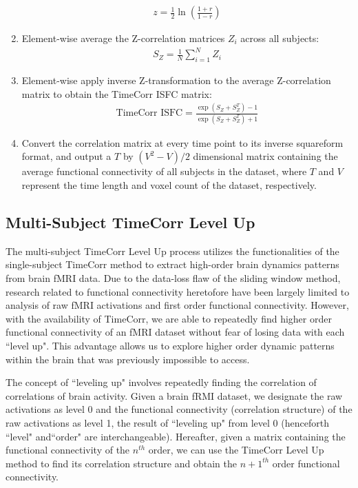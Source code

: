\documentclass[11pt]{article}
\begin{document}
\begin{enumerate}
\begin{align*}
z = \frac{1}{2}\ln(\frac{1+r}{1-r})
\end{align*}
\item Element-wise average the Z-correlation matrices $Z_i$ across all subjects:
\begin{align*}
S_Z = \frac{1}{N}\sum^N_{i=1}Z_i
\end{align*}
\item Element-wise apply inverse Z-transformation to the average Z-correlation matrix to obtain the TimeCorr ISFC matrix:
\begin{align*}
\text{TimeCorr ISFC} = \frac{\exp(S_Z+S_Z^T)-1}{\exp(S_Z+S_Z^T)+1}
\end{align*}
\item Convert the correlation matrix at every time point to its inverse squareform format, and output a $T$ by $(V^2-V)/2$ dimensional matrix containing the average functional connectivity of all subjects in the dataset, where $T$ and $V$ represent the time length and voxel count of the dataset, respectively.
\end{enumerate}

\subsection{Multi-Subject TimeCorr Level Up}
The multi-subject TimeCorr Level Up process utilizes the functionalities of the single-subject TimeCorr method to extract high-order brain dynamics patterns from brain fMRI data. Due to the data-loss flaw of the sliding window method, research related to functional connectivity heretofore have been largely limited to analysis of raw fMRI activations and first order functional connectivity. However, with the availability of TimeCorr, we are able to repeatedly find higher order functional connectivity of an fMRI dataset without fear of losing data with each ``level up". This advantage allows us to explore higher order dynamic patterns within the brain that was previously impossible to access.

The concept of ``leveling up" involves repeatedly finding the correlation of correlations of brain activity. Given a brain fRMI dataset, we designate the raw activations as level 0 and the functional connectivity (correlation structure) of the raw activations as level 1, the result of ``leveling up" from level 0 (henceforth ``level" and``order" are interchangeable). Hereafter, given a matrix containing the functional connectivity of the $n^{th}$ order, we can use the TimeCorr Level Up method to find its correlation structure and obtain the $n+1^{th}$ order functional connectivity.
\end{document}

